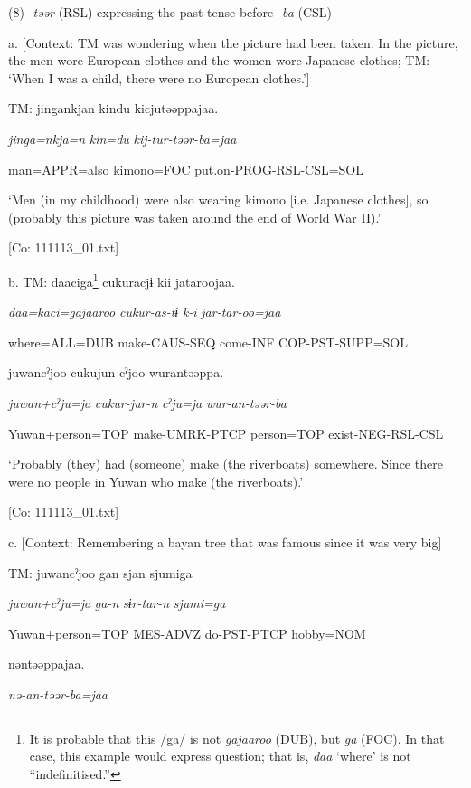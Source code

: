 (8)  \textit{{}-təər} (RSL) expressing the past tense before \textit{{}-ba} (CSL)

  a.  [Context: TM was wondering when the picture had been taken. In the picture, the men wore European clothes and the women wore Japanese clothes; TM: ‘When I was a child, there were no European clothes.’]

    TM:  jingankjan  kindu  kicjutəəppajaa.

      \textit{jinga=nkja=n}  \textit{kin=du}  \textit{kij-tur-təər-ba=jaa}

      man=APPR=also  kimono=FOC  put.on-PROG-RSL-CSL=SOL

      ‘Men (in my childhood) were also wearing kimono [i.e. Japanese clothes], so (probably this picture was taken around the end of World War II).’

      [Co: 111113\_01.txt]

  b.  TM:  daaciga\footnote{It is probable that this /ga/ is not \textit{gajaaroo} (DUB), but \textit{ga} (FOC). In that case, this example would express question; that is, \textit{daa} ‘where’ is not “indefinitised.”}  cukuracjɨ  kii  jataroojaa.

      \textit{daa=kaci=gajaaroo}  \textit{cukur-as-tɨ}  \textit{k-i}  \textit{jar-tar-oo=jaa}

      where=ALL=DUB  make-CAUS-SEQ  come-INF  COP-PST-SUPP=SOL

      juwancˀjoo  cukujun  cˀjoo  wurantəəppa.

      \textit{juwan+cˀju=ja}  \textit{cukur-jur-n}  \textit{cˀju=ja}  \textit{wur-an-təər-ba}

      Yuwan+person=TOP  make-UMRK-PTCP  person=TOP  exist-NEG-RSL-CSL

      ‘Probably (they) had (someone) make (the riverboats) somewhere. Since there were no people in Yuwan who make (the riverboats).’

      [Co: 111113\_01.txt]

  c.  [Context: Remembering a bayan tree that was famous since it was very big]

    TM:  juwancˀjoo  gan  sjan  {\textbar}sjumi{\textbar}ga

      \textit{juwan+cˀju=ja}  \textit{ga-n}  \textit{sɨr-tar-n}  \textit{sjumi=ga}

      Yuwan+person=TOP  MES-ADVZ  do-PST-PTCP  hobby=NOM

      nəntəəppajaa.

      \textit{nə-an-təər-ba=jaa}

